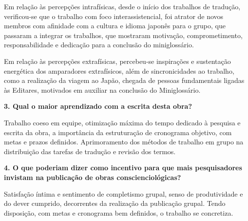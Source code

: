 \documentclass{gescons}
\begin{document}
\begin{multicols}{2}
Em relação às percepções intrafísicas, desde o início dos trabalhos de tradução, verificou-se que o trabalho com foco interassistencial, foi atrator de novos membros com afinidade com a cultura e idioma japonês para o grupo, que passaram a integrar os trabalhos, que mostraram motivação, comprometimento, responsabilidade e dedicação para a conclusão do miniglossário.

Em relação às percepções extrafísicas, percebeu-se inspirações e sustentação energética dos amparadores extrafísicos, além de sincronicidades ao trabalho, como a realização da viagem ao Japão, chegada de pessoas fundamentais ligadas às Editares, motivados em auxiliar na conclusão do Miniglossário.

\textbf{3. Qual o maior aprendizado com a escrita desta obra?}

Trabalho coeso em equipe, otimização máxima do tempo dedicado à pesquisa e escrita da obra, a importância da estruturação de cronograma objetivo, com metas e prazos definidos. Aprimoramento dos métodos de trabalho em grupo na distribuição das tarefas de tradução e revisão dos termos.


\textbf{4. O que poderiam dizer como incentivo para que mais pesquisadores invistam na publicação de obras conscienciológicas?}

Satisfação íntima e sentimento de completismo grupal, senso de produtividade e do dever cumprido, decorrentes da realização da publicação grupal. Tendo disposição, com metas e cronograma bem definidos, o trabalho se concretiza.

    \end{multicols}
\end{document}
